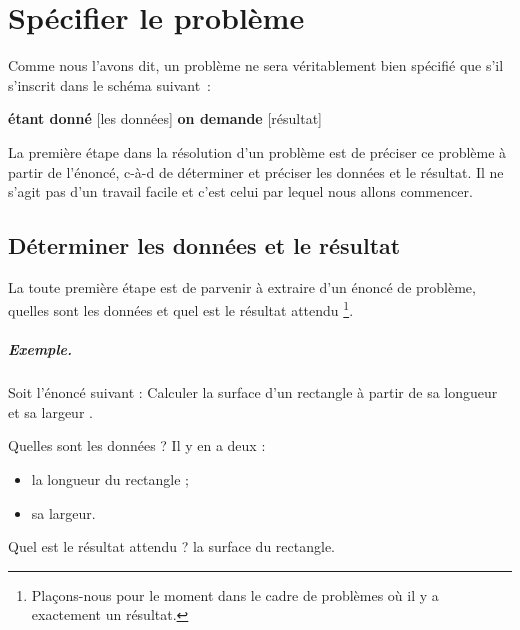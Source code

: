 \chapter{Spécifier le problème}

	Comme nous l'avons dit, 
	un problème ne sera véritablement bien spécifié 
	que s’il s’inscrit dans le schéma suivant~:
		
	\medskip
	\begin{center}
	\begin{Ovalbox}
		{\textbf{étant donné} [les données] 
		\textbf{on demande} [résultat]}
	\end{Ovalbox}
	\end{center}
	\medskip
	
	La première étape dans la résolution d’un problème est de
	préciser ce problème à partir de l'énoncé,
	c-à-d de déterminer et préciser les données et le résultat.
	Il ne s’agit pas d’un travail facile 
	et c'est celui par lequel nous allons commencer.

	\section{Déterminer les données et le résultat}
	
		La toute première étape est de parvenir à extraire
		d'un énoncé de problème, quelles sont les données
		et quel est le résultat attendu%
		\footnote{%
			Plaçons-nous pour le moment dans le cadre
			de problèmes où il y a exactement un résultat.%
		}.
	
		\begin{Emphase}
			\paragraph{Exemple.}
			Soit l'énoncé suivant :
			\og
				Calculer la surface d'un rectangle 
				à partir de sa longueur et sa largeur
			\fg.
			
			Quelles sont les données ? Il y en a deux :	
			\begin{itemize}
				\item la longueur du rectangle ;
				\item sa largeur.
			\end{itemize}
		
			Quel est le résultat attendu ? la surface du rectangle.
		\end{Emphase}
		
